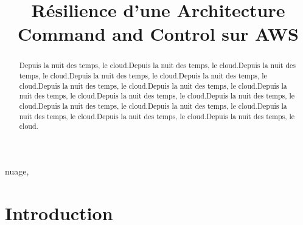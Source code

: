 \documentclass[conference]{IEEEtran}
\begin{document}
\title{Résilience d'une Architecture Command and Control sur AWS
}

\author{
\and
{}
\and
{}
\and
{}
}


\maketitle

\begin{abstract}
Depuis la nuit des temps, le cloud.Depuis la nuit des temps, le cloud.Depuis la nuit des temps, le cloud.Depuis la nuit des temps, le cloud.Depuis la nuit des temps, le cloud.Depuis la nuit des temps, le cloud.Depuis la nuit des temps, le cloud.Depuis la nuit des temps, le cloud.Depuis la nuit des temps, le cloud.Depuis la nuit des temps, le cloud.Depuis la nuit des temps, le cloud.Depuis la nuit des temps, le cloud.Depuis la nuit des temps, le cloud.Depuis la nuit des temps, le cloud.Depuis la nuit des temps, le cloud.
\end{abstract}

\begin{IEEEkeywords}
nuage,
\end{IEEEkeywords}

\section{Introduction}
\end{document}
